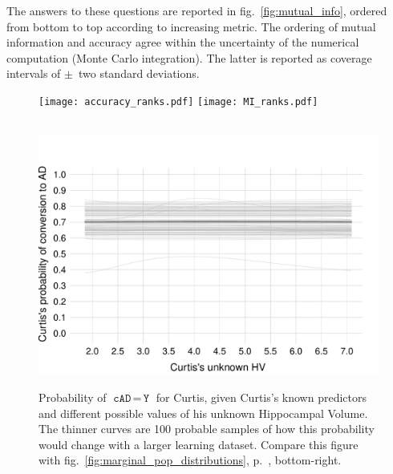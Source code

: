 \documentclass[utf8]{FrontiersinHarvard_mod} %
\newcommand*{\mo}[1][=]{\mathord{\,#1\,}}
\newcommand*{\fig}{fig.}%
\renewcommand*{\|}[1][]{\nonscript\:#1\vert\nonscript\:\mathopen{}}
\newcommand*{\cad}{\texttt{cAD}}
\newcommand*{\yes}{\texttt{Y}}
\newcommand*{\ad}{Alzheimer's Disease}
\begin{document}
The answers to these questions are reported in \fig~\ref{fig:mutual_info}, ordered from bottom to top according to increasing metric. The ordering of mutual information and accuracy agree within the uncertainty of the numerical computation (Monte Carlo integration). The latter is reported as coverage intervals of $\pm$~two standard deviations.
\begin{subfigure}[t]\setcounter{subfigure}{0}%
  \centering%
\begin{minipage}[c]{\linewidth}
\texttt{[image: accuracy\_ranks.pdf]}%
\hfill%
\texttt{[image: MI\_ranks.pdf]}%
\caption{Expected accuracy for the next new patient (left), and mutual information (right), of several sets of predictors for the prognosis of conversion to \ad. Each graph has been vertically ordered according to increasing values; the two rankings agree within the respective uncertainties. The \texttt{all} predictor set is mathematically guaranteed to be optimal according to both metrics and has therefore been ranked first. Bars show the uncertainty interval ($\pm$~two standard deviations).}\label{fig:mutual_info}
\end{minipage}\\
\includegraphics[width=0.49\linewidth]{curtis_prob_conversion_HV.pdf}%
\begin{minipage}[b]{0.49\linewidth}\caption{Probability of $\cad\mo\yes$ for Curtis, given Curtis's known predictors and different possible values of his unknown Hippocampal Volume. The thinner curves are 100 probable samples of how this probability would change with a larger learning dataset. Compare this figure with \fig~\ref{fig:marginal_pop_distributions}, p.~\pageref{fig:marginal_pop_distributions}, bottom-right.}\label{fig:curtis_prediction}\vspace{3em}\mbox{}
\end{minipage}
\end{subfigure}%
\end{document}
